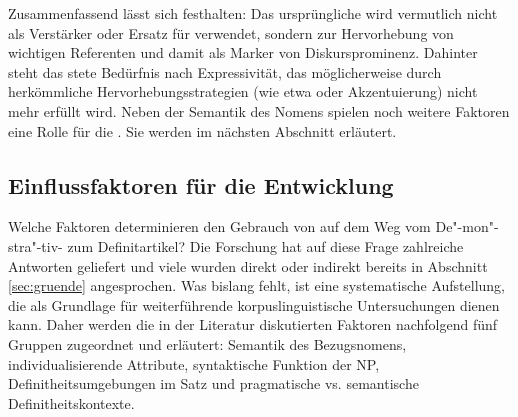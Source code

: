 Zusammenfassend lässt sich festhalten: Das ursprüngliche  wird vermutlich nicht als Verstärker oder Ersatz für  verwendet, sondern zur Hervorhebung von wichtigen Referenten und damit als Marker von Diskursprominenz. Dahinter steht das stete Bedürfnis nach Expressivität, das möglicherweise durch herkömmliche Hervorhebungsstrategien (wie etwa  oder Akzentuierung) nicht mehr erfüllt wird. Neben der Semantik des Nomens spielen noch weitere Faktoren eine Rolle für die . Sie werden im nächsten Abschnitt erläutert.   

\subsection{Einflussfaktoren für die Entwicklung} \label{sec:extension}

Welche Faktoren determinieren den Gebrauch von  auf dem Weg vom De"-mon"-stra"-tiv- zum Definitartikel?  Die Forschung hat auf diese Frage zahlreiche Antworten geliefert und viele wurden direkt oder indirekt bereits in Abschnitt \ref{sec:gruende} angesprochen.  Was bislang  fehlt, ist eine systematische Aufstellung, die als Grundlage für weiterführende korpuslinguistische  Untersuchungen dienen kann.  
Daher werden die in der Literatur diskutierten Faktoren nachfolgend fünf Gruppen zugeordnet und erläutert: Semantik des Bezugsnomens, individualisierende  Attribute, syntaktische Funktion der  NP, Definitheitsumgebungen im Satz und pragmatische vs. semantische Definitheitskontexte.



